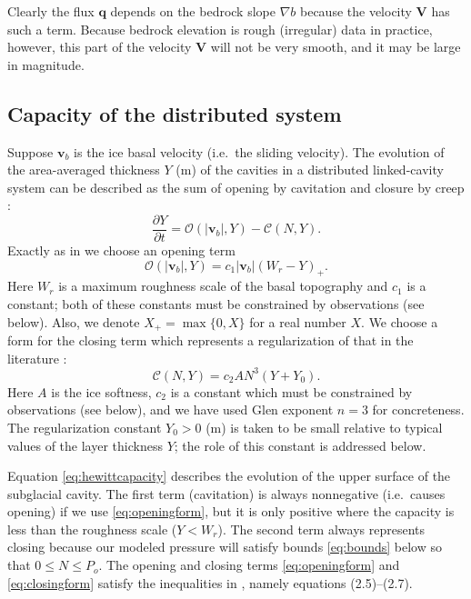 \documentclass[11pt,final]{amsart}%
\newcommand\bv{\mathbf{v}}
\newcommand\bV{\mathbf{V}}
\newcommand\bq{\mathbf{q}}
\newcommand{\grad}{\nabla}
\begin{document}
Clearly the flux $\bq$ depends on the bedrock slope $\grad b$ because the velocity $\bV$ has such a term.  Because bedrock elevation is rough (irregular) data in practice, however, this part of the velocity $\bV$ will not be very smooth, and it may be large in magnitude.


\subsection*{Capacity of the distributed system}  Suppose $\bv_b$ is the ice basal velocity (i.e.~the sliding velocity).  The evolution of the area-averaged thickness $Y$ (m) of the cavities in a distributed linked-cavity system \citep{Schoofetal2012} can be described as the sum of opening by cavitation and closure by creep \citep{Hewitt2011}:
\begin{equation}
\frac{\partial Y}{\partial t} = \mathcal{O}(|\bv_b|,Y) - \mathcal{C}(N,Y). \label{eq:hewittcapacity}
\end{equation}
Exactly as in \cite{Schoofetal2012} we choose an opening term
\begin{equation}
 \mathcal{O}(|\bv_b|,Y) = c_1 |\bv_b| (W_r - Y)_+. \label{eq:openingform}
\end{equation}
Here $W_r$ is a maximum roughness scale of the basal topography and $c_1$ is a constant; both of these constants must be constrained by observations (see below).  Also, we denote $X_+= \max\{0,X\}$ for a real number $X$.  We choose a form for the closing term which represents a regularization of that in the literature \citep{Hewitt2011,Schoofmeltsupply,Schoofetal2012}:
\begin{equation}
\mathcal{C}(N,Y) = c_2 A N^3 (Y+Y_0). \label{eq:closingform}
\end{equation}
Here $A$ is the ice softness, $c_2$ is a constant which must be constrained by observations (see below), and we have used Glen exponent $n=3$ for concreteness.  The regularization constant $Y_0>0$ (m) is taken to be small relative to typical values of the layer thickness $Y$; the role of this constant is addressed below.

Equation \eqref{eq:hewittcapacity} describes the evolution of the upper surface of the subglacial cavity.  The first term (cavitation) is always nonnegative (i.e.~causes opening) if we use \eqref{eq:openingform}, but it is only positive where the capacity is less than the roughness scale ($Y<W_r$).  The second term always represents closing because our modeled pressure will satisfy bounds \eqref{eq:bounds} below so that $0\le N \le P_o$.  The opening and closing terms \eqref{eq:openingform} and \eqref{eq:closingform} satisfy the inequalities in \cite{Schoofetal2012}, namely equations (2.5)--(2.7).
\end{document}
